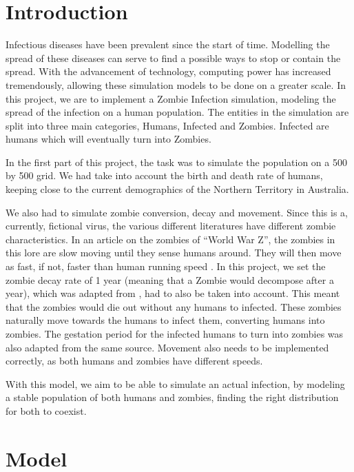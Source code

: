 \documentclass[a4paper]{article}
\title{\mytitle}
\author{\myauthor}
\begin{document}
\maketitle

\section{Introduction} %

Infectious diseases have been prevalent since the start of time. Modelling the spread of these diseases can serve to find a possible ways to stop or contain the spread. With the advancement of technology, computing power has increased tremendously, allowing these simulation models to be done on a greater scale. In this project, we are to implement a Zombie Infection simulation, modeling the spread of the infection on a human population. The entities in the simulation are split into three main categories, Humans, Infected and Zombies. Infected are humans which will eventually turn into Zombies. 

In the first part of this project, the task was to simulate the population on a 500 by 500 grid. We had take into account the birth and death rate of humans, keeping close to the current demographics of the Northern Territory in Australia. 

We also had to simulate zombie conversion, decay and movement. Since this is a, currently, fictional virus, the various different literatures have different zombie characteristics. In an article on the zombies of “World War Z”, the zombies in this lore are slow moving until they sense humans around. They will then move as fast, if not, faster than human running speed \cite{guidetozombies}. In this project, we set the zombie decay rate of 1 year (meaning that a Zombie would decompose after a year), which was adapted from \cite{zombiepedia}, had to also be taken into account. This meant that the zombies would die out without any humans to infected. These zombies naturally move towards the humans to infect them, converting humans into zombies. The gestation period for the infected humans to turn into zombies was also adapted from the same source. Movement also needs to be implemented correctly, as both humans and zombies have different speeds.

With this model, we aim to be able to simulate an actual infection, by modeling a stable population of both humans and zombies, finding the right distribution for both to coexist. 

\section{Model} %
\end{document}
